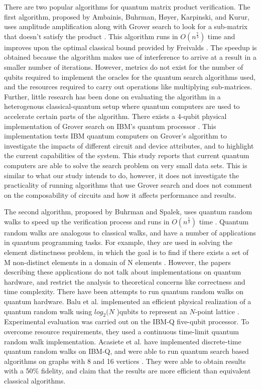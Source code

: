 \documentclass[10pt]{proc}
\theoremstyle{definition}
\theoremstyle{remark}
\begin{document}
There are two popular algorithms for quantum matrix product verification. The
first algorithm, proposed by Ambainis, Buhrman, Høyer, Karpinski, and Kurur,
uses amplitude amplification along with Grover search to look for a sub-matrix
that doesn’t satisfy the product \cite{ambainis_quantum_2002}. This algorithm
runs in $O(n^{\frac{7}{3}})$ time and improves upon the optimal classical bound provided by
Freivalds \cite{freivalds_fast_1979}. The speedup is obtained because the
algorithm makes use of interference to arrive at a result in a smaller number
of iterations. However, metrics do not exist for the number of qubits required
to implement the oracles for the quantum search algorithms used, and the
resources required to carry out operations like multiplying sub-matrices.
Further, little research has been done on evaluating the algorithm in a
heterogenous classical-quantum setup where quantum computers are used to
accelerate certain parts of the algorithm. There exists a 4-qubit physical
implementation of Grover search on IBM’s quantum processor
\cite{mandviwalla_implementing_2018}. This implementation tests IBM quantum
computers on Grover’s algorithm to investigate the impacts of different circuit
and device attributes, and to highlight the current capabilities of the system.
This study reports that current quantum computers are able to solve the search
problem on very small data sets. This is similar to what our study intends to
do, however, it does not investigate the practicality of running algorithms
that use Grover search and does not comment on the composability of circuits
and how it affects performance and results. 

The second algorithm, proposed by Buhrman and Spalek, uses quantum random walks
to speed up the verification process and runs in $O(n^\frac{5}{3})$ time
\cite{buhrman_quantum_2005}. Quantum random walks are analogous to classical
walks, and have a number of applications in quantum programming tasks. For
example, they are used in solving the element distinctness problem, in which
the goal is to find if there exists a set of M non-distinct elements in a
domain of N elements \cite{ambainis_quantum_2007}.  However, the papers
describing these applications do not talk about implementations on quantum
hardware, and restrict the analysis to theoretical concerns like correctness
and time complexity. There have been attempts to run quantum random walks on
quantum hardware. Balu et al. implemented an efficient physical realization of
a quantum random walk using $log_2(N$ )qubits to represent an $N$-point lattice
\cite{balu_physical_2018}. Experimental evaluation was carried out on the IBM-Q
five-qubit processor. To overcome resource requirements, they used a continuous
time-limit quantum random walk implementation. Acasiete et al. have implemented
discrete-time quantum random walks on IBM-Q, and were able to run quantum
search based algorithms on graphs with 8 and 16 vertices
\cite{acasiete_implementation_2020}. They were able to obtain results with a
50\% fidelity, and claim that the results are more efficient than equivalent
classical algorithms.
\end{document}

